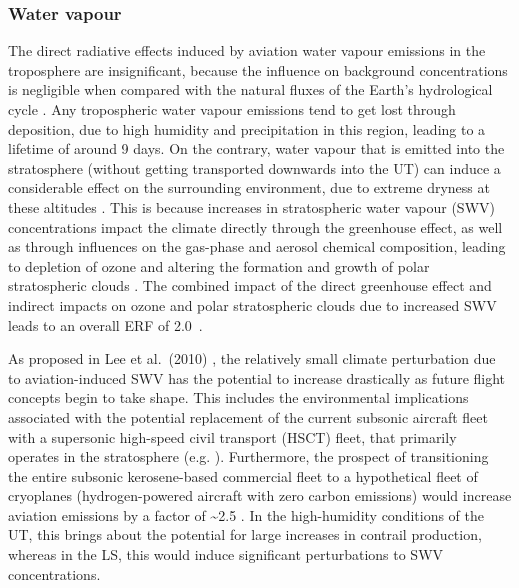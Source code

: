 \subsubsection{Water vapour}
The direct radiative effects induced by aviation water vapour emissions in the troposphere are insignificant, because the influence on background concentrations is negligible when compared with the natural fluxes of the Earth's hydrological cycle \cite{IPCC1999}. Any tropospheric water vapour emissions tend to get lost through deposition, due to high humidity and precipitation in this region, leading to a lifetime of around 9 days. On the contrary, water vapour that is emitted into the stratosphere (without getting transported downwards into the UT) can induce a considerable effect on the surrounding environment, due to extreme dryness at these altitudes \cite{Jensen1996}. This is because increases in stratospheric water vapour (SWV) concentrations impact the climate directly through the greenhouse effect, as well as through influences on the gas-phase and aerosol chemical composition, leading to depletion of ozone and altering the formation and growth of polar stratospheric clouds \cite{Stenke2005}. The combined impact of the direct greenhouse effect and indirect impacts on ozone and polar stratospheric clouds due to increased SWV leads to an overall ERF of 2.0~.

As proposed in Lee et al.\ (2010) \cite{Lee2010}, the relatively small climate perturbation due to aviation-induced SWV has the potential to increase drastically as future flight concepts begin to take shape. This includes the environmental implications associated with the potential replacement of the current subsonic aircraft fleet with a supersonic high-speed civil transport (HSCT) fleet, that primarily operates in the stratosphere (e.g. \cite{MiakeLye1993, Danilin1994, Grooss1998, Kawa1999}). Furthermore, the prospect of transitioning the entire subsonic kerosene-based commercial fleet to a hypothetical fleet of cryoplanes (hydrogen-powered aircraft with zero carbon emissions) would increase aviation  emissions by a factor of \textasciitilde2.5 \cite{Gauss2003}. In the high-humidity conditions of the UT, this brings about the potential for large increases in contrail production, whereas in the LS, this would induce significant perturbations to SWV concentrations.



